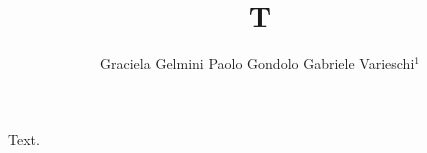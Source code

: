 \documentclass{revtex4-2}
\begin{document}
\title{T}
\author{Graciela Gelmini Paolo Gondolo
Gabriele Varieschi$^{1}$}
\address{
${}^{1}$ Dept. of Physics, UCLA\\
Los Angeles CA 90095, USA\\
{\rm gelmini,variesch@physics.ucla.edu}
\\~\\
${}^{2}$ Max-Planck-Institut f\"ur Physik\\
M\"unchen, Germany\\
{\rm gondolo@mppmu.mpg.de}
}
\maketitle
Text.
\end{document}
